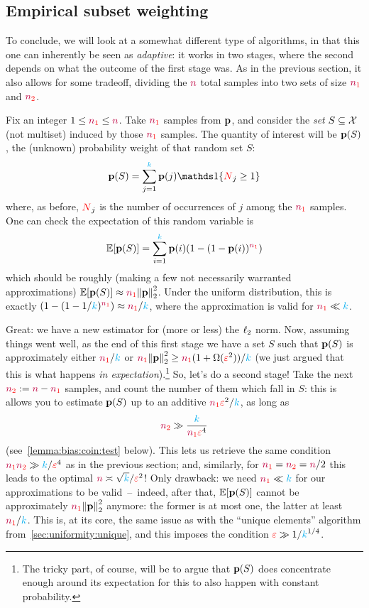 \subsection{Empirical subset weighting} 
To conclude, we will look at a somewhat different type of algorithms, in that this one can inherently be seen as \emph{adaptive}: it works in two stages, where the second depends on what the outcome of the first stage was. As in the previous section, it also allows for some tradeoff, dividing the $\ns$ total samples into two sets of size $\nss$ and $\nst$.


Fix an integer $1\leq \nss \leq \ns$. Take $\nss$ \iid samples from $\p$, and consider the \emph{set} $S\subseteq\domain$ (not multiset) induced by those $\nss$ samples. The quantity of interest will be $\p(S)$, the (unknown) probability weight of that random set $S$:
\begin{equation}
    \p(S) = \sum_{j=1}^\ab \p(j) \indic{\occur_j \geq 1}
\end{equation}
where, as before, $\occur_j$ is the number of occurrences of $j$ among the $\nss$ samples. One can check the expectation of this random variable is
\begin{equation}
  \label{eq:expect:empirical:weight}
    \expect{\p(S)} = \sum_{i=1}^\ab \p(i) (1-(1-\p(i))^{\nss})
\end{equation}
which should be roughly (making a few not necessarily warranted approximations) $\expect{\p(S)}\approx \nss\normtwo{\p}^2$. Under the uniform distribution, this is exactly $(1-(1-1/\ab)^{\nss})\approx \nss/\ab$, where the approximation is valid for $\nss\ll \ab$.

Great: we have a new estimator for (more or less) the $\lp[2]$ norm. Now, assuming things went well, as the end of this first stage we have a set $S$ such that $\p(S)$ is approximately either $\nss/\ab$ or $\nss\normtwo{\p}^2\geq \nss(1+\Omega(\dst^2))/\ab$ (we just argued that this is what happens \emph{in expectation}).\footnote{The tricky part, of course, will be to argue that $\p(S)$ does concentrate enough around its expectation for this to also happen with constant probability.} So, let's do a second stage! Take the next $\nst \eqdef \ns-\nss$ samples, and count the number of them which fall in $S$: this is allows you to estimate $\p(S)$  up to an additive $\nss\dst^2/\ab$, as long as
\[
      \nst \gg \frac{\ab}{\nss\dst^4}
\]
(see~\cref{lemma:bias:coin:test} below). This lets us retrieve the same condition $\nss\nst\gg \ab/\dst^4$ as in the previous section; and, similarly, for $\nss=\nst=\ns/2$ this leads to the optimal $\ns \asymp \sqrt{\ab}/\dst^2$! Only drawback: we need $\nss\ll \ab$ for our approximations to be valid~--~indeed, after that, $\expect{\p(S)}$ cannot be approximately $\nss\normtwo{\p}^2$ anymore: the former is at most one, the latter at least $\nss/\ab$. This is, at its core, the same issue as with the ``unique elements'' algorithm from~\cref{sec:uniformity:unique}, and this imposes the condition $\dst \gg 1/\ab^{1/4}$.

